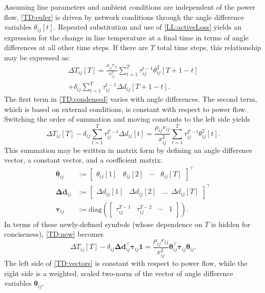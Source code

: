 \documentclass[conference]{IEEEtran}
\begin{document}
Assuming line parameters and ambient conditions are independent of the
power flow, \eqref{TD:euler} is driven by network conditions through
the angle difference variables $\theta_{ij}[t]$. Repeated substitution
and use of \eqref{LL:activeLoss} yields an expression for the change
in line temperature at a final time in terms of angle differences at
all other time steps. If there are $T$ total time steps, this
relationship may be expressed as:
\begin{multline}
\label{TD:condensed}
\Delta T_{ij}[T] = \frac{\rho_{ij} r_{ij}}{x_{ij}^2}\sum_{t=1}^{T}\tau_{ij}^{t-1}\theta_{ij}^2[T+1-t] \\
+ \delta_{ij} \sum_{t=1}^{T}\tau_{ij}^{t-1}\Delta d_{ij} [T+1 - t].
\end{multline}
The first term in \eqref{TD:condensed} varies with angle
differences. The second term, which is based on external conditions,
is constant with respect to power flow. Switching the order of
summation and moving constants to the left side yields
\begin{equation}
\label{TD:new}
\Delta T_{ij}[T] - \delta_{ij} \sum_{t=1}^{T}\tau_{ij}^{T-t}\Delta d_{ij} [t]
 = \frac{\rho_{ij}r_{ij}}{x_{ij}^2} \sum_{t=1}^{T} \tau_{ij}^{T-t}\theta_{ij}^2[t].
\end{equation}
This summation may be written in matrix form by defining an angle
difference vector, a constant vector, and a coefficient matrix:
\begin{subequations}\label{TD:matvec}
\begin{align}
\boldsymbol{\theta}_{ij} &:= \begin{bmatrix}\theta_{ij}[1] & \theta_{ij}[2] & \cdots & \theta_{ij}[T] \end{bmatrix}^\top \\
\boldsymbol{\Delta d}_{ij} &:= \begin{bmatrix}
\Delta d_{ij}[1] & \Delta d_{ij}[2] & \ldots ~~ \Delta d_{ij}[T] 
\end{bmatrix}^\top \\
\boldsymbol{\tau}_{ij} &:= \text{diag}\left(\begin{bmatrix} \tau_{ij}^{T-1} & \tau_{ij}^{T-2} & \cdots & 1 \end{bmatrix}\right).
\end{align}
\end{subequations}
In terms of these newly-defined symbols (whose dependence on $T$ is hidden for conciseness), \eqref{TD:new} becomes
\begin{equation}
\label{TD:vectors}
\Delta T_{ij}[T] - \delta_{ij} \boldsymbol{\Delta d}_{ij}^\top \boldsymbol{\tau}_{ij}\mathbf{1} = \frac{\rho_{ij}r_{ij}}{x_{ij}^2} \boldsymbol{\theta}_{ij}^\top \boldsymbol{\tau}_{ij}\boldsymbol{\theta}_{ij}.
\end{equation}
The left side of \eqref{TD:vectors} is constant with respect to power flow, while the right side is a weighted, scaled two-norm of the vector of angle difference variables $\boldsymbol{\theta}_{ij}$.
\end{document}
